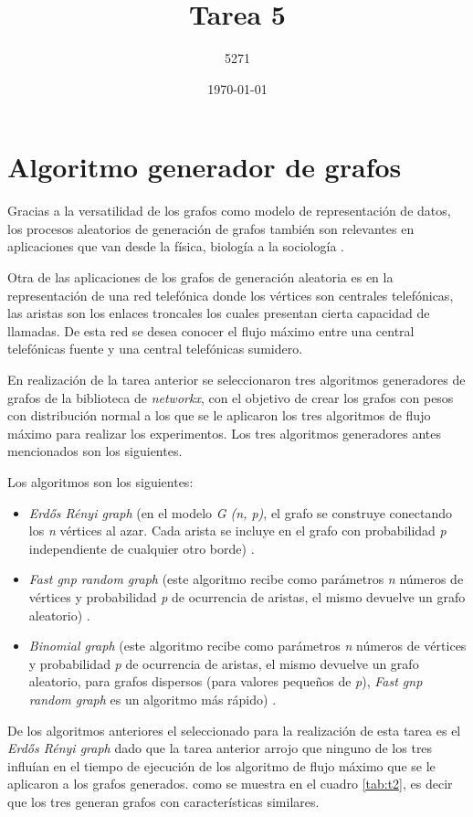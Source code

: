 \documentclass{article}
\title{Tarea 5}
\author{5271}
\date{\today}
\begin{document}
\maketitle

\section{Algoritmo generador de grafos}

Gracias a la versatilidad de los grafos como modelo de representación de datos, los procesos aleatorios de generación de grafos también son relevantes en aplicaciones que van desde la física, biología a la sociología \cite{Nobari}.

Otra de las aplicaciones de los grafos de generación aleatoria es en la representación de una red telefónica donde los vértices son centrales telefónicas, las aristas son los enlaces troncales los cuales presentan cierta capacidad de llamadas. De esta red se desea conocer el flujo máximo entre una central telefónicas fuente y una central telefónicas sumidero.

En realización de la tarea anterior se seleccionaron tres algoritmos generadores de grafos de la biblioteca de \textit{networkx}, con el objetivo de crear los grafos con pesos con distribución normal a los que se le aplicaron los tres algoritmos de flujo máximo para realizar los experimentos. Los tres algoritmos generadores antes mencionados son los siguientes.		
 
Los algoritmos son los siguientes:

\begin{itemize}
  \item\textit{Erdős Rényi graph} (en el modelo \textit {G (n, p)}, el grafo se construye conectando los \textit{n} vértices al azar. Cada arista se incluye en el grafo con probabilidad \textit{p} independiente de cualquier otro borde)  \cite{erg}.  
   \item\textit{Fast gnp random graph} (este algoritmo recibe como parámetros \textit{n} números de vértices y probabilidad \textit{p} de ocurrencia de aristas, el mismo devuelve un grafo aleatorio) \cite{rgf}.
	\item\textit{Binomial graph} (este algoritmo recibe como parámetros \textit{n} números de vértices y probabilidad \textit{p} de ocurrencia de aristas, el mismo devuelve un grafo aleatorio, para grafos dispersos (para valores pequeños de \textit{p}), \textit{Fast gnp random graph} es un algoritmo más rápido) \cite{bg}.
\end{itemize}
De los algoritmos anteriores el seleccionado para la realización de esta tarea es el \textit{Erdős Rényi graph} dado que la tarea anterior arrojo que ninguno de los tres influían en el tiempo de ejecución de los algoritmo de flujo máximo que se le aplicaron a los grafos generados. como se muestra en el cuadro \ref{tab:t2}, es decir que los tres generan grafos con características similares.
\end{document}
